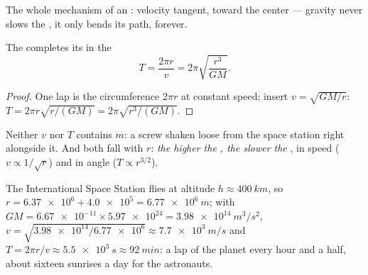 \begin{omfigure}

{\small The whole mechanism of an : velocity tangent, 
toward the center --- gravity never slows the , it only
bends its path, forever.}
\end{omfigure}

\begin{proposition}\label{prop:g12:satellites-kepler:period}
The  completes its  in the 
\[ T = \frac{2\pi r}{v} = 2\pi \sqrt{\frac{r^3}{G M}}. \]
\end{proposition}

\begin{proof}
One lap is the circumference $2\pi r$ at constant speed; insert
$v = \sqrt{GM/r}$: $T = 2\pi r\sqrt{r/(GM)} = 2\pi\sqrt{r^3/(GM)}$.
\end{proof}

Neither $v$ nor $T$ contains $m$: a screw shaken loose from the
space station  right alongside it. And both fall with $r$:
\emph{the higher the , the slower the }, in speed
($v \propto 1/\sqrt r$) and in angle ($T \propto r^{3/2}$).

\begin{example}\label{ex:g12:satellites-kepler:iss}
The International Space Station flies at altitude
$h \approx \qty{400}{km}$, so $r = \num{6.37e6} + \num{4.0e5} =
\qty{6.77e6}{m}$; with $GM = \num{6.67e-11} \times \num{5.97e24} =
\qty{3.98e14}{m^3/s^2}$, $v = \sqrt{\num{3.98e14}/\num{6.77e6}}
\approx \qty{7.7e3}{m/s}$ and $T = 2\pi r/v \approx \qty{5.5e3}{s}
\approx \qty{92}{min}$: a lap of the planet every hour and a half,
about sixteen sunrises a day for the astronauts.
\end{example}


